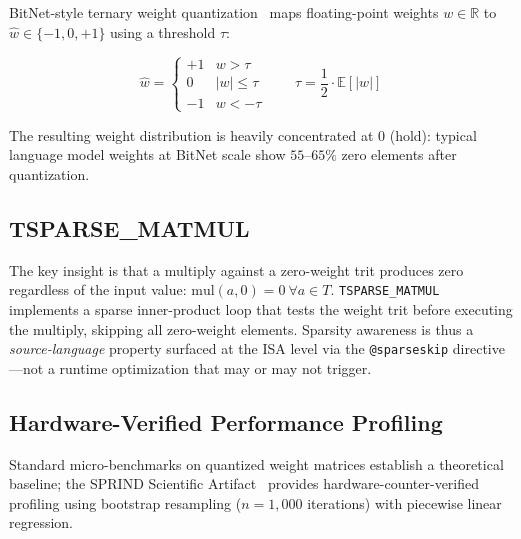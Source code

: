 \documentclass[journal,10pt,twocolumn]{IEEEtran}
\begin{document}
BitNet-style ternary weight quantization~\cite{ma2024era} maps floating-point
weights $w \in \mathbb{R}$ to $\hat{w} \in \{-1, 0, +1\}$ using a threshold
$\tau$:

\begin{equation}
  \hat{w} = \begin{cases}
    +1 & w >  \tau \\
     0 & |w| \leq \tau \\
    -1 & w < -\tau
  \end{cases}
  \qquad \tau = \frac{1}{2} \cdot \mathbb{E}[|w|]
  \label{eq:quantize}
\end{equation}

The resulting weight distribution is heavily concentrated at $0$ (hold):
typical language model weights at BitNet scale show $55$--$65\%$ zero
elements after quantization.

\subsection{TSPARSE\_MATMUL}

The key insight is that a multiply against a zero-weight trit produces zero
regardless of the input value:
$\mathrm{mul}(a, 0) = 0\ \forall a \in T$.
\texttt{TSPARSE\_MATMUL} implements a sparse inner-product loop that tests
the weight trit before executing the multiply, skipping all zero-weight
elements. Sparsity awareness is thus a \emph{source-language} property
surfaced at the ISA level via the \texttt{@sparseskip} directive---not a
runtime optimization that may or may not trigger.

\subsection{Hardware-Verified Performance Profiling}
\label{subsec:hwperf}

Standard micro-benchmarks on quantized weight matrices establish a
theoretical baseline; the SPRIND Scientific Artifact~\cite{sprind2026}
provides hardware-counter-verified profiling using bootstrap resampling
($n = 1{,}000$ iterations) with piecewise linear regression.
\end{document}
